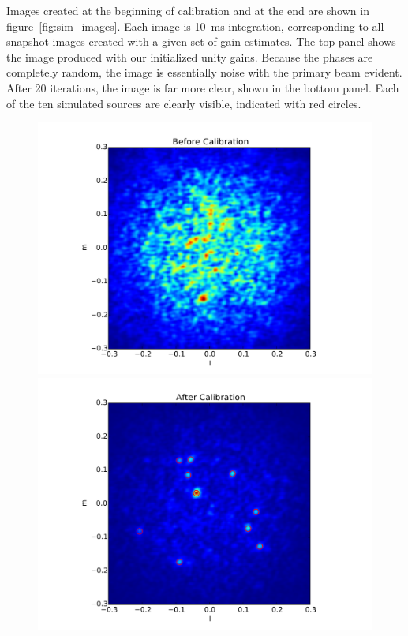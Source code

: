 \documentclass[a4paper,fleqn,usenatbib]{../mnras}
\begin{document}
Images created at the beginning of calibration and at the end are shown in figure~\ref{fig:sim_images}. Each image is 10~ms integration, corresponding to all snapshot images created with a given set of gain estimates. The top panel shows the image produced with our initialized unity gains. Because the phases are completely random, the image is essentially noise with the primary beam evident. After 20 iterations, the image is far more clear, shown in the bottom panel. Each of the ten simulated sources are clearly visible, indicated with red circles. 



\begin{figure}
\begin{center}
\includegraphics[width=\columnwidth]{figures/cal_paper_sim_image_before.pdf}
\includegraphics[width=\columnwidth]{figures/cal_paper_sim_image_after.pdf}

\end{center}
\end{figure}
\end{document}
